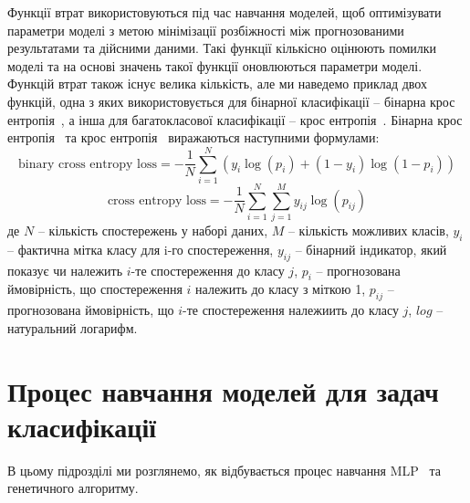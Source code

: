 Функції втрат використовуються під час навчання моделей, щоб оптимізувати параметри моделі з метою мінімізації розбіжності між прогнозованими результатами та дійсними даними. Такі функції кількісно оцінюють помилки моделі та на основі значень такої функції оновлюються параметри моделі. Функцій втрат також існує велика кількість, але ми наведемо приклад двох функцій, одна з яких використовується для бінарної класифікації -- бінарна крос ентропія~\cite{ct27}, а інша для багатокласової класифікації -- крос ентропія~\cite{ct28}. Бінарна крос ентропія~\cite{ct27} та крос ентропія~\cite{ct28} виражаються наступними формулами:
\begin{equation}
	\label{eq:binary_cross_entropy}
	\text{binary cross entropy loss} = -\frac{1}{N} \sum_{i=1}^{N} \left( y_i \log(p_i) + (1 - y_i) \log(1 - p_i) \right)
\end{equation}
\begin{equation}
	\label{eq:cross_entropy}
	\text{cross entropy loss} = -\frac{1}{N} \sum_{i=1}^{N} \sum_{j=1}^{M} y_{ij} \log(p_{ij})
\end{equation}
де $N$ -- кількість спостережень у наборі даних, $M$ -- кількість можливих класів, $y_i$ -- фактична мітка класу для i-го спостереження, $y_{ij}$ -- бінарний індикатор, який показує чи належить $i$-те спостереження до класу $j$, $p_i$ -- прогнозована ймовірність, що спостереження $i$ належить до класу з міткою 1, $p_{ij}$ -- прогнозована ймовірність, що $i$-те спостереження належиить до класу $j$, $log$ -- натуральний логарифм.

\section{Процес навчання моделей для задач класифікації}


В цьому підрозділі ми розглянемо, як відбувається процес навчання MLP~\cite{ct26} та генетичного алгоритму.

